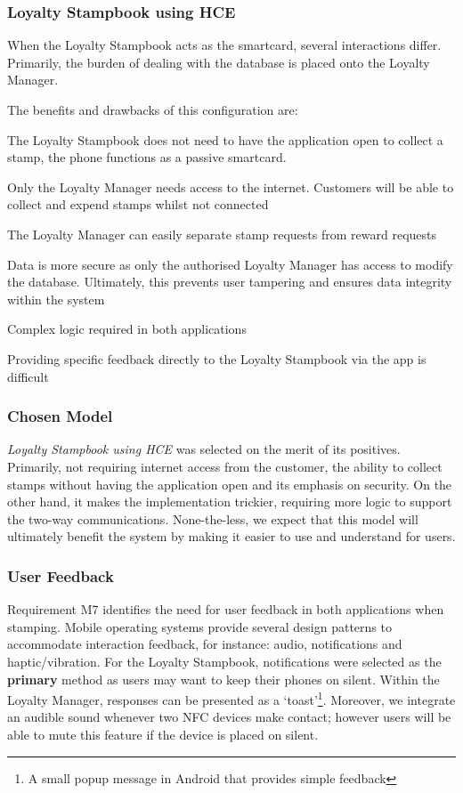 \subsubsection{Loyalty Stampbook using HCE}
When the Loyalty Stampbook acts as the smartcard, several interactions differ. Primarily, the burden of dealing with the database is placed onto the Loyalty Manager.

The benefits and drawbacks of this configuration are: 
\begin{description}[leftmargin=!,labelwidth=\widthof{\bfseries small}]
    \item[+] The Loyalty Stampbook does not need to have the application open to collect a stamp, the phone functions as a passive smartcard.
    \item[+] Only the Loyalty Manager needs access to the internet. Customers will be able to collect and expend stamps whilst not connected
    \item[+] The Loyalty Manager can easily separate stamp requests from reward requests
    \item[+] Data is more secure as only the authorised Loyalty Manager has access to modify the database. Ultimately, this prevents user tampering and ensures data integrity within the system
    \item[---] Complex logic required in both applications
    \item[---] Providing specific feedback directly to the Loyalty Stampbook via the app is difficult
\end{description}

\subsubsection{Chosen Model}
\emph{Loyalty Stampbook using HCE} was selected on the merit of its positives. Primarily, not requiring internet access from the customer, the ability to collect stamps without having the application open and its emphasis on security. On the other hand, it makes the implementation trickier, requiring more logic to support the two-way communications. None-the-less, we expect that this model will ultimately benefit the system by making it easier to use and understand for users.

\subsubsection{User Feedback}
Requirement M7 identifies the need for user feedback in both applications when stamping. Mobile operating systems provide several design patterns to accommodate interaction feedback, for instance: audio, notifications and haptic/vibration. For the Loyalty Stampbook, notifications were selected as the \textbf{primary} method as users may want to keep their phones on silent. Within the Loyalty Manager, responses can be presented as a `toast'\cite{toast}\footnote{A small popup message in Android that provides simple feedback}. Moreover, we integrate an audible sound whenever two NFC devices make contact; however users will be able to mute this feature if the device is placed on silent. 

